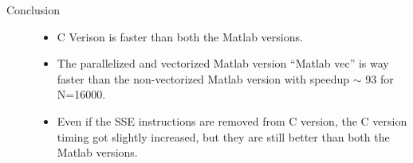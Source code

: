\documentclass[10pt,twoside]{article}
\begin{document}
 \begin{description}
    \item[Conclusion] \hfill 
      \begin{itemize}
        \item C Verison is faster than both the Matlab versions.  
        \item The parallelized and vectorized Matlab version ``Matlab vec'' is way faster than the non-vectorized Matlab version with speedup $\sim$ 93 for N=16000.
        \item Even if the SSE instructions are removed from C version, the C version timing got slightly increased, but they are still better than both the Matlab versions.  
      \end{itemize}
  \end{description}
\end{document}
